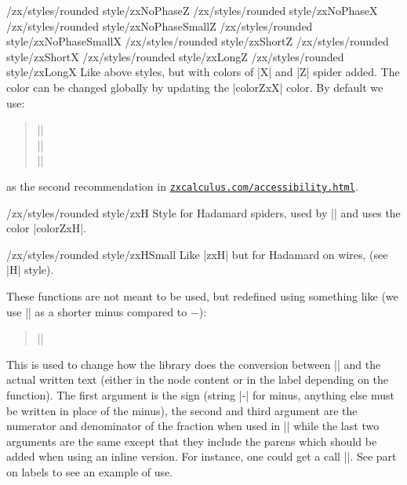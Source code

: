 \documentclass[a4paper]{ltxdoc}
\begin{document}
\begin{pgfmanualentry}
  \makeatletter
  \def\extrakeytext{style, }
  \extractkey/zx/styles/rounded style/zxNoPhaseZ\@nil%
  \extractkey/zx/styles/rounded style/zxNoPhaseX\@nil%
  \extractkey/zx/styles/rounded style/zxNoPhaseSmallZ\@nil%
  \extractkey/zx/styles/rounded style/zxNoPhaseSmallX\@nil%
  \extractkey/zx/styles/rounded style/zxShortZ\@nil%
  \extractkey/zx/styles/rounded style/zxShortX\@nil%
  \extractkey/zx/styles/rounded style/zxLongZ\@nil%
  \extractkey/zx/styles/rounded style/zxLongX\@nil%
  \makeatother
  \pgfmanualbody
  Like above styles, but with colors of |X| and |Z| spider added. The color can be changed globally by updating the |colorZxX| color. By default we use:
  \begin{verse}
    ||\\
    ||\\
    ||
  \end{verse}
  as the second recommendation in \href{https://zxcalculus.com/accessibility.html}{\texttt{zxcalculus.com/accessibility.html}}.
\end{pgfmanualentry}

\begin{stylekey}{/zx/styles/rounded style/zxH}
  Style for Hadamard spiders, used by |\zxH{}| and uses the color |colorZxH|.
\end{stylekey}

\begin{stylekey}{/zx/styles/rounded style/zxHSmall}
  Like |zxH| but for Hadamard on wires, (see |H| style).
\end{stylekey}

\begin{pgfmanualentry}
  \extractcommand\zxConvertToFracInContent{}\@@
  \extractcommand\zxConvertToFracInLabel\@@
  \pgfmanualbody
  These functions are not meant to be used, but redefined using something like (we use |\zxMinus| as a shorter minus compared to $-$):
\begin{verse}
  ||
\end{verse}
This is used to change how the library does the conversion between |\zxFrac| and the actual written text (either in the node content or in the label depending on the function). The first argument is the sign (string |-| for minus, anything else must be written in place of the minus), the second and third argument are the numerator and denominator of the fraction when used in |\frac{}{}| while the last two arguments are the same except that they include the parens which should be added when using an inline version. For instance, one could get a call ||. See part on labels to see an example of use.
\end{pgfmanualentry}
\end{document}
